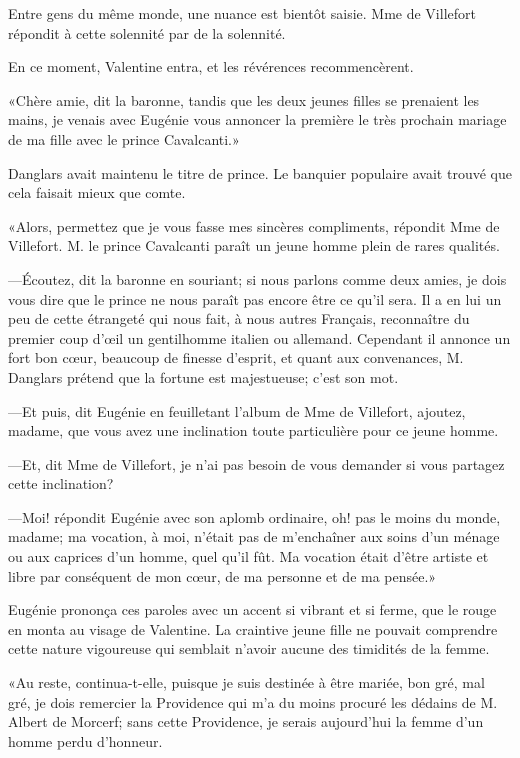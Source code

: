 Entre gens du même monde, une nuance est bientôt saisie. Mme de Villefort répondit à cette solennité par de la solennité. 

En ce moment, Valentine entra, et les révérences recommencèrent. 

«Chère amie, dit la baronne, tandis que les deux jeunes filles se prenaient les mains, je venais avec Eugénie vous annoncer la première le très prochain mariage de ma fille avec le prince Cavalcanti.» 

Danglars avait maintenu le titre de prince. Le banquier populaire avait trouvé que cela faisait mieux que comte. 

«Alors, permettez que je vous fasse mes sincères compliments, répondit Mme de Villefort. M. le prince Cavalcanti paraît un jeune homme plein de rares qualités. 

—Écoutez, dit la baronne en souriant; si nous parlons comme deux amies, je dois vous dire que le prince ne nous paraît pas encore être ce qu'il sera. Il a en lui un peu de cette étrangeté qui nous fait, à nous autres Français, reconnaître du premier coup d'œil un gentilhomme italien ou allemand. Cependant il annonce un fort bon cœur, beaucoup de finesse d'esprit, et quant aux convenances, M. Danglars prétend que la fortune est majestueuse; c'est son mot. 

—Et puis, dit Eugénie en feuilletant l'album de Mme de Villefort, ajoutez, madame, que vous avez une inclination toute particulière pour ce jeune homme. 

—Et, dit Mme de Villefort, je n'ai pas besoin de vous demander si vous partagez cette inclination? 

—Moi! répondit Eugénie avec son aplomb ordinaire, oh! pas le moins du monde, madame; ma vocation, à moi, n'était pas de m'enchaîner aux soins d'un ménage ou aux caprices d'un homme, quel qu'il fût. Ma vocation était d'être artiste et libre par conséquent de mon cœur, de ma personne et de ma pensée.» 

Eugénie prononça ces paroles avec un accent si vibrant et si ferme, que le rouge en monta au visage de Valentine. La craintive jeune fille ne pouvait comprendre cette nature vigoureuse qui semblait n'avoir aucune des timidités de la femme. 

«Au reste, continua-t-elle, puisque je suis destinée à être mariée, bon gré, mal gré, je dois remercier la Providence qui m'a du moins procuré les dédains de M. Albert de Morcerf; sans cette Providence, je serais aujourd'hui la femme d'un homme perdu d'honneur. 

